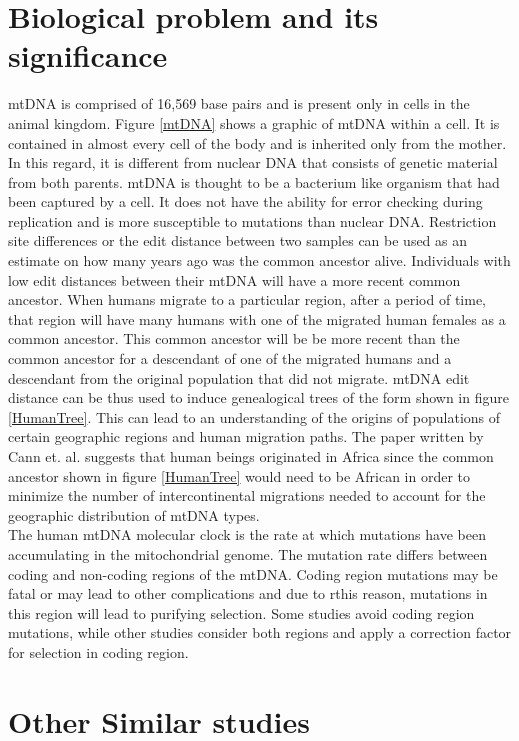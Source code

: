 \documentclass[conference]{IEEEtran}
\begin{document}
\section{Biological problem and its significance}
mtDNA is comprised of 16,569 base pairs and is present only in cells in the animal kingdom. Figure \ref{mtDNA} shows a graphic of mtDNA within a cell. It is contained in almost every cell of the body and is inherited only from the mother. In this regard, it is different from nuclear DNA that consists of genetic material from both parents. mtDNA is thought to be a bacterium like organism that had been captured by a cell. It does not have the ability for error checking during replication and is more susceptible to mutations than nuclear DNA. Restriction site differences or the edit distance between two samples can be used as an estimate on how many years ago was the common ancestor alive. Individuals with low edit distances between their mtDNA will have a more recent common ancestor. When humans migrate to a particular region, after a period of time, that region will have many humans with one of the migrated human females as a common ancestor. This common ancestor will be be more recent than the common ancestor for a descendant of one of the migrated humans and a descendant from the original population that did not migrate. mtDNA edit distance can be thus used to induce genealogical trees of the form shown in figure \ref{HumanTree}. This can lead to an understanding of the origins of populations of certain geographic regions and human migration paths. The paper written by Cann et. al. suggests that human beings originated in Africa since the common ancestor shown in figure \ref{HumanTree} would need to be African in order to minimize the number of intercontinental migrations needed to account for the geographic distribution of mtDNA types.\\

The human mtDNA molecular clock is the rate at which mutations have been accumulating in the mitochondrial genome. The mutation rate differs between coding and non-coding regions of the mtDNA. Coding region mutations may be fatal or may lead to other complications and due to rthis reason, mutations in this region will lead to purifying selection. Some studies avoid coding region mutations, while other studies consider both regions 
 and apply a correction factor for selection in coding region. 

\FloatBarrier
\section{Other Similar studies}
\end{document}
